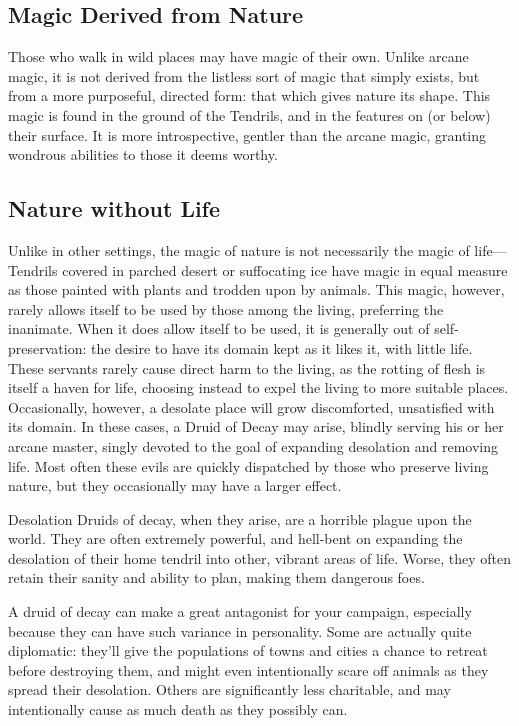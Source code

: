 \begin{multicols}{2}

\section{Magic Derived from Nature}
Those who walk in wild places may have magic of their own.
Unlike arcane magic, it is not derived from the listless sort of magic that simply exists, but from a more purposeful, directed form: that which gives nature its shape.
This magic is found in the ground of the Tendrils, and in the features on (or below) their surface.
It is more introspective, gentler than the arcane magic, granting wondrous abilities to those it deems worthy. 

\subsection{Nature without Life}
Unlike in other settings, the magic of nature is not necessarily the magic of life---Tendrils covered in parched desert or suffocating ice have magic in equal measure as those painted with plants and trodden upon by animals.
This magic, however, rarely allows itself to be used by those among the living, preferring the inanimate.
When it does allow itself to be used, it is generally out of self-preservation: the desire to have its domain kept as it likes it, with little life.
These servants rarely cause direct harm to the living, as the rotting of flesh is itself a haven for life, choosing instead to expel the living to more suitable places.
\label{druidofdecay}
Occasionally, however, a desolate place will grow discomforted, unsatisfied with its domain.
In these cases, a Druid of Decay may arise, blindly serving his or her arcane master, singly devoted to the goal of expanding desolation and removing life.
Most often these evils are quickly dispatched by those who preserve living nature, but they occasionally may have a larger effect.

\begin{adventureidea}{Desolation}
Druids of decay, when they arise, are a horrible plague upon the world.
They are often extremely powerful, and hell-bent on expanding the desolation of their home tendril into other, vibrant areas of life.
Worse, they often retain their sanity and ability to plan, making them dangerous foes.

A druid of decay can make a great antagonist for your campaign, especially because they can have such variance in personality.
Some are actually quite diplomatic: they'll give the populations of towns and cities a chance to retreat before destroying them, and might even intentionally scare off animals as they spread their desolation.
Others are significantly less charitable, and may intentionally cause as much death as they possibly can.
\end{adventureidea}


\end{multicols}
